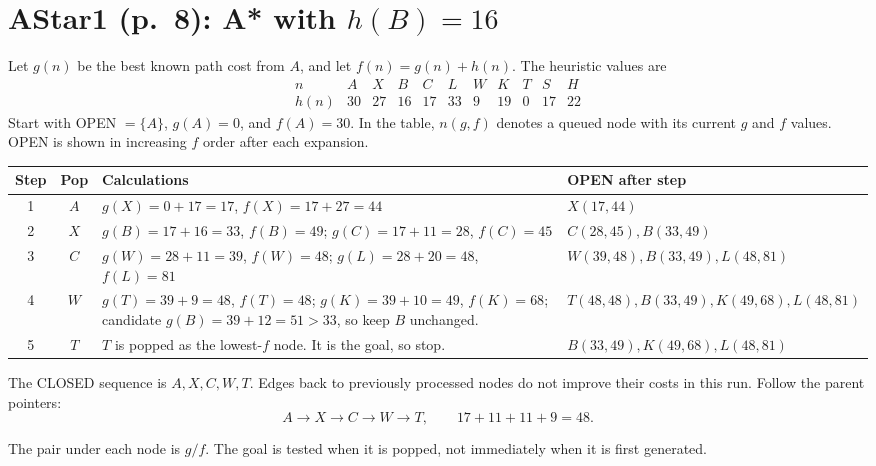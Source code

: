 \documentclass[11pt,a4paper]{article}
\newcommand{\question}[2]{\section*{#1: #2}}
\begin{document}
\newpage
\question{AStar1 (p.\ 8)}{A* with $h(B)=16$}
Let $g(n)$ be the best known path cost from $A$, and let $f(n)=g(n)+h(n)$. The heuristic values are
\[
\begin{array}{c|rrrrrrrrrr}
n&A&X&B&C&L&W&K&T&S&H\\\hline
h(n)&30&27&16&17&33&9&19&0&17&22
\end{array}
\]
Start with OPEN $=\{A\}$, $g(A)=0$, and $f(A)=30$. In the table, $n(g,f)$ denotes a queued node with its current $g$ and $f$ values. OPEN is shown in increasing $f$ order after each expansion.
\begin{center}\small\begin{tabular}{c|c|p{6.4cm}|p{4.4cm}}\toprule
Step&Pop&Calculations&OPEN after step\\\midrule
1&$A$&$g(X)=0+17=17$, $f(X)=17+27=44$&$X(17,44)$\\
2&$X$&$g(B)=17+16=33$, $f(B)=49$; $g(C)=17+11=28$, $f(C)=45$&$C(28,45),B(33,49)$\\
3&$C$&$g(W)=28+11=39$, $f(W)=48$; $g(L)=28+20=48$, $f(L)=81$&$W(39,48),B(33,49),L(48,81)$\\
4&$W$&$g(T)=39+9=48$, $f(T)=48$; $g(K)=39+10=49$, $f(K)=68$; candidate $g(B)=39+12=51>33$, so keep $B$ unchanged.&$T(48,48),B(33,49),K(49,68),L(48,81)$\\
5&$T$&$T$ is popped as the lowest-$f$ node. It is the goal, so stop.&$B(33,49),K(49,68),L(48,81)$\\\bottomrule\end{tabular}\normalsize\end{center}
The CLOSED sequence is $A,X,C,W,T$. Edges back to previously processed nodes do not improve their costs in this run. Follow the parent pointers:
\[
\boxed{A\to X\to C\to W\to T},\qquad
\boxed{17+11+11+9=48}.
\]
\begin{center}\end{center}
The pair under each node is $g/f$. The goal is tested when it is popped, not immediately when it is first generated.
\end{document}
